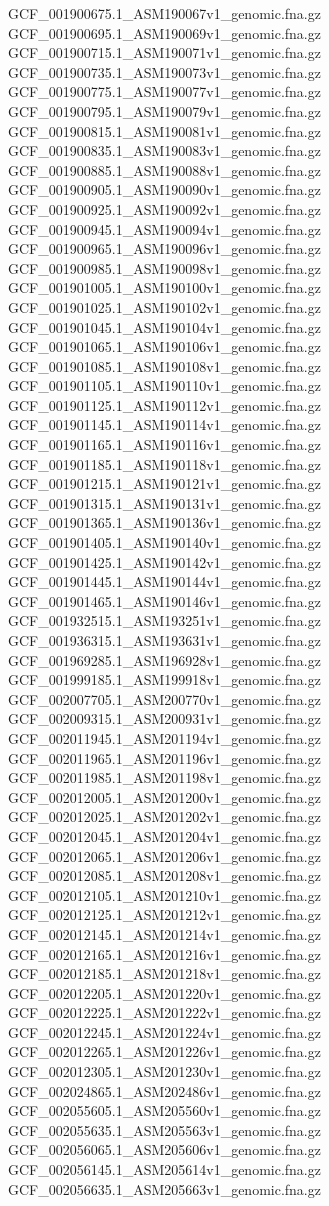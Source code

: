 \documentclass[12pt, letterpaper]{article}
\begin{document}
\begin{verbatim*}
GCF_001900675.1_ASM190067v1_genomic.fna.gz
GCF_001900695.1_ASM190069v1_genomic.fna.gz
GCF_001900715.1_ASM190071v1_genomic.fna.gz
GCF_001900735.1_ASM190073v1_genomic.fna.gz
GCF_001900775.1_ASM190077v1_genomic.fna.gz
GCF_001900795.1_ASM190079v1_genomic.fna.gz
GCF_001900815.1_ASM190081v1_genomic.fna.gz
GCF_001900835.1_ASM190083v1_genomic.fna.gz
GCF_001900885.1_ASM190088v1_genomic.fna.gz
GCF_001900905.1_ASM190090v1_genomic.fna.gz
GCF_001900925.1_ASM190092v1_genomic.fna.gz
GCF_001900945.1_ASM190094v1_genomic.fna.gz
GCF_001900965.1_ASM190096v1_genomic.fna.gz
GCF_001900985.1_ASM190098v1_genomic.fna.gz
GCF_001901005.1_ASM190100v1_genomic.fna.gz
GCF_001901025.1_ASM190102v1_genomic.fna.gz
GCF_001901045.1_ASM190104v1_genomic.fna.gz
GCF_001901065.1_ASM190106v1_genomic.fna.gz
GCF_001901085.1_ASM190108v1_genomic.fna.gz
GCF_001901105.1_ASM190110v1_genomic.fna.gz
GCF_001901125.1_ASM190112v1_genomic.fna.gz
GCF_001901145.1_ASM190114v1_genomic.fna.gz
GCF_001901165.1_ASM190116v1_genomic.fna.gz
GCF_001901185.1_ASM190118v1_genomic.fna.gz
GCF_001901215.1_ASM190121v1_genomic.fna.gz
GCF_001901315.1_ASM190131v1_genomic.fna.gz
GCF_001901365.1_ASM190136v1_genomic.fna.gz
GCF_001901405.1_ASM190140v1_genomic.fna.gz
GCF_001901425.1_ASM190142v1_genomic.fna.gz
GCF_001901445.1_ASM190144v1_genomic.fna.gz
GCF_001901465.1_ASM190146v1_genomic.fna.gz
GCF_001932515.1_ASM193251v1_genomic.fna.gz
GCF_001936315.1_ASM193631v1_genomic.fna.gz
GCF_001969285.1_ASM196928v1_genomic.fna.gz
GCF_001999185.1_ASM199918v1_genomic.fna.gz
GCF_002007705.1_ASM200770v1_genomic.fna.gz
GCF_002009315.1_ASM200931v1_genomic.fna.gz
GCF_002011945.1_ASM201194v1_genomic.fna.gz
GCF_002011965.1_ASM201196v1_genomic.fna.gz
GCF_002011985.1_ASM201198v1_genomic.fna.gz
GCF_002012005.1_ASM201200v1_genomic.fna.gz
GCF_002012025.1_ASM201202v1_genomic.fna.gz
GCF_002012045.1_ASM201204v1_genomic.fna.gz
GCF_002012065.1_ASM201206v1_genomic.fna.gz
GCF_002012085.1_ASM201208v1_genomic.fna.gz
GCF_002012105.1_ASM201210v1_genomic.fna.gz
GCF_002012125.1_ASM201212v1_genomic.fna.gz
GCF_002012145.1_ASM201214v1_genomic.fna.gz
GCF_002012165.1_ASM201216v1_genomic.fna.gz
GCF_002012185.1_ASM201218v1_genomic.fna.gz
GCF_002012205.1_ASM201220v1_genomic.fna.gz
GCF_002012225.1_ASM201222v1_genomic.fna.gz
GCF_002012245.1_ASM201224v1_genomic.fna.gz
GCF_002012265.1_ASM201226v1_genomic.fna.gz
GCF_002012305.1_ASM201230v1_genomic.fna.gz
GCF_002024865.1_ASM202486v1_genomic.fna.gz
GCF_002055605.1_ASM205560v1_genomic.fna.gz
GCF_002055635.1_ASM205563v1_genomic.fna.gz
GCF_002056065.1_ASM205606v1_genomic.fna.gz
GCF_002056145.1_ASM205614v1_genomic.fna.gz
GCF_002056635.1_ASM205663v1_genomic.fna.gz

\end{verbatim*}
\end{document}
